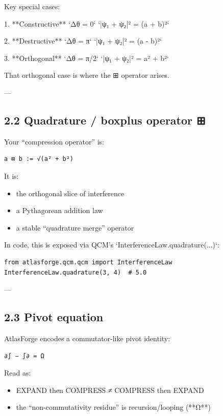 \documentclass[11pt]{article}
\begin{document}
Key special cases:

1. **Constructive** `Δθ = 0`  
   `|ψ₁ + ψ₂|² = (a + b)²`

2. **Destructive** `Δθ = π`  
   `|ψ₁ + ψ₂|² = (a - b)²`

3. **Orthogonal** `Δθ = π/2`  
   `|ψ₁ + ψ₂|² = a² + b²`

That orthogonal case is where the ⊞ operator arises.

---

\subsection{2.2 Quadrature / boxplus operator ⊞}

Your “compression operator” is:

\begin{lstlisting}
a ⊞ b := √(a² + b²)
\end{lstlisting}

It is:
\begin{itemize}
\item the orthogonal slice of interference
\item a Pythagorean addition law
\item a stable “quadrature merge” operator
\end{itemize}

In code, this is exposed via QCM’s `InterferenceLaw.quadrature(...)`:

\begin{lstlisting}
from atlasforge.qcm.qcm import InterferenceLaw
InterferenceLaw.quadrature(3, 4)  # 5.0
\end{lstlisting}

---

\subsection{2.3 Pivot equation}

AtlasForge encodes a commutator-like pivot identity:

\begin{lstlisting}
∂∫ − ∫∂ = Ω
\end{lstlisting}

Read as:
\begin{itemize}
\item EXPAND then COMPRESS ≠ COMPRESS then EXPAND
\item the “non-commutativity residue” is recursion/looping (**Ω**)
\end{itemize}
\end{document}
